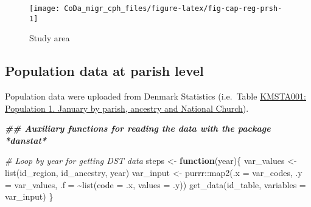 \documentclass[
  12pt,
]{article}
\newenvironment{Shaded}{\begin{snugshade}}{\end{snugshade}}
\newcommand{\AttributeTok}[1]{\textcolor[rgb]{0.77,0.63,0.00}{#1}}
\newcommand{\CommentTok}[1]{\textcolor[rgb]{0.56,0.35,0.01}{\textit{#1}}}
\newcommand{\ControlFlowTok}[1]{\textcolor[rgb]{0.13,0.29,0.53}{\textbf{#1}}}
\newcommand{\DocumentationTok}[1]{\textcolor[rgb]{0.56,0.35,0.01}{\textbf{\textit{#1}}}}
\newcommand{\FunctionTok}[1]{\textcolor[rgb]{0.00,0.00,0.00}{#1}}
\newcommand{\NormalTok}[1]{#1}
\newcommand{\OtherTok}[1]{\textcolor[rgb]{0.56,0.35,0.01}{#1}}
\newcommand{\SpecialCharTok}[1]{\textcolor[rgb]{0.00,0.00,0.00}{#1}}
\begin{document}
\begin{figure}[H]

{\centering \texttt{[image: CoDa\_migr\_cph\_files/figure-latex/fig-cap-reg-prsh-1]} 

}

\caption{Study area}\label{fig:fig-cap-reg-prsh}
\end{figure}

\hypertarget{population-data-at-parish-level}{%
\subsection{Population data at parish
level}\label{population-data-at-parish-level}}

Population data were uploaded from Denmark Statistics (i.e.~Table
\href{https://www.statbank.dk/statbank5a/SelectVarVal/Define.asp?MainTable=KMSTA001\&PLanguage=1\&PXSId=0\&wsid=cftree}{KMSTA001:
Population 1. January by parish, ancestry and National Church}).

\begin{Shaded}
\begin{Highlighting}[]
\DocumentationTok{\#\# Auxiliary functions for reading the data with the package *danstat*}

\CommentTok{\# Loop by year for getting DST data }
\NormalTok{  steps }\OtherTok{\textless{}{-}} \ControlFlowTok{function}\NormalTok{(year)\{}
\NormalTok{    var\_values }\OtherTok{\textless{}{-}} \FunctionTok{list}\NormalTok{(id\_region, id\_ancestry, year)}
\NormalTok{    var\_input }\OtherTok{\textless{}{-}}\NormalTok{ purrr}\SpecialCharTok{::}\FunctionTok{map2}\NormalTok{(}\AttributeTok{.x =}\NormalTok{ var\_codes,}
                             \AttributeTok{.y =}\NormalTok{ var\_values,}
                             \AttributeTok{.f =} \SpecialCharTok{\textasciitilde{}}\FunctionTok{list}\NormalTok{(}\AttributeTok{code =}\NormalTok{ .x, }\AttributeTok{values =}\NormalTok{ .y))}
    \FunctionTok{get\_data}\NormalTok{(id\_table, }\AttributeTok{variables =}\NormalTok{ var\_input)}
\NormalTok{  \}}
\end{Highlighting}
\end{Shaded}
\end{document}
